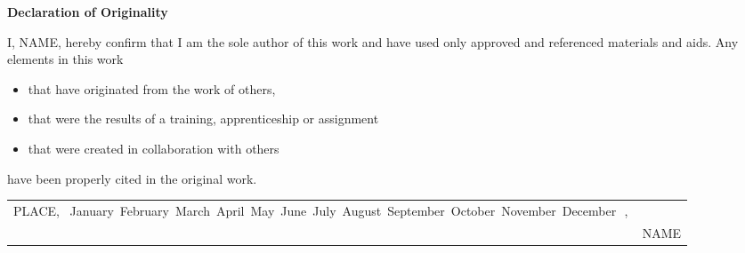 


\def\name{NAME}
\def\place{PLACE}
\def\dateformat{1} %



\def\monthname{
  \ifcase\month
    \or January
    \or February
    \or March
    \or April
    \or May
    \or June
    \or July
    \or August
    \or September
    \or October
    \or November
    \or December
  \fi
}

\def\daysuffix{
  \ifcase\day
  \or st 
  \or nd 
  \or rd 
  \or th 
  \or th 
  \or th 
  \or th 
  \or th 
  \or th 
  \or th 
  \or th 
  \or th 
  \or th 
  \or th 
  \or th 
  \or th 
  \or th 
  \or th 
  \or th 
  \or th 
  \or st 
  \or nd 
  \or rd 
  \or th 
  \or th 
  \or th 
  \or th 
  \or th 
  \or th 
  \or th 
  \or st 
  \fi
}

\def\specdate{
  \ifcase\dateformat
     {\leavevmode\hbox{\monthname\,\the\day,\,\the\year}}
    \or {\leavevmode\hbox{\monthname\,\the\day,\,\the\year}}
    \or {\leavevmode\hbox{\the\day\textsuperscript{\daysuffix}\,\monthname,\,\the\year}}
    \or {\leavevmode\hbox{\monthname,\,\the\year}}
  \fi
}

\newpage
\thispagestyle{empty}
\sffamily
\hspace{0pt}
\vfill
\begin{center}
\bfseries \large Declaration of Originality
\end{center}\vspace{3mm}

\noindent I, \name, hereby confirm
that I am the sole author of this work
and have used only approved and referenced materials and aids.
Any elements in this work
\begin{itemize}
    \setlength{\itemsep}{0.5pt}
    \item that have originated from the work of others,
    \item that were the results of a training, apprenticeship or assignment
    \item that were created in collaboration with others
\end{itemize}

\noindent have been properly cited in the original work.
\vspace{2cm}

\begin{centering}
\begin{tabular}{lc}
\place, \specdate \hspace*{1.8cm} & \underline{\hspace{6cm}} \\
& \name
\end{tabular}
\end{centering}

\vfill
\hspace{0pt}
\newpage